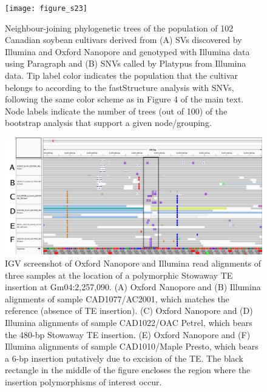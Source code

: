 \documentclass[12pt]{article}
\newenvironment{lsfigure}
	{\begin{landscape} \begin{figure} \centering}
	{\end{figure} \end{landscape}}
\begin{document}
\begin{lsfigure}
	\texttt{[image: figure\_s23]}

	\caption[Neighbour-joining phylogenetic trees of the population of 102 Canadian soybean cultivars]{
		Neighbour-joining phylogenetic trees of the population of 102 Canadian soybean cultivars derived from (A) SVs discovered by Illumina and Oxford Nanopore and genotyped with Illumina data using Paragraph and (B) SNVs called by Platypus from Illumina data.
		Tip label color indicates the population that the cultivar belongs to according to the fastStructure analysis with SNVs, following the same color scheme as in Figure 4 of the main text.
		Node labels indicate the number of trees (out of 100) of the bootstrap analysis that support a given node/grouping.
	}

	\label{fig_s23}
\end{lsfigure}

\clearpage%

\begin{lsfigure}
	\includegraphics[width = 9.5in]{Gm04_2257090_annotated}

	\caption[IGV screenshot of Oxford Nanopore and Illumina read alignments of three samples at the location of a polymorphic Stowaway TE insertion]{
		IGV screenshot of Oxford Nanopore and Illumina read alignments of three samples at the location of a polymorphic Stowaway TE insertion at Gm04:2,257,090.
		(A) Oxford Nanopore and (B) Illumina alignments of sample CAD1077/AC2001, which matches the reference (absence of TE insertion).
		(C) Oxford Nanopore and (D) Illumina alignments of sample CAD1022/OAC Petrel, which bears the 480-bp Stowaway TE insertion.
		(E) Oxford Nanopore and (F) Illumina alignments of sample CAD1010/Maple Presto, which bears a 6-bp insertion putatively due to excision of the TE.
		The black rectangle in the middle of the figure encloses the region where the insertion polymorphisms of interest occur.
	}

	\label{fig_s24}

\end{lsfigure}
\end{document}
